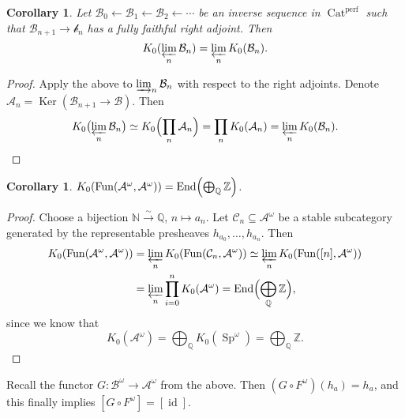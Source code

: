 \documentclass[draft]{amsart}
\newcommand{\NN}{\mathbb{N}}
\newcommand{\ZZ}{\mathbb{Z}}
\newcommand{\QQ}{\mathbb{Q}}
\newcommand{\cat}[1]{\mathcal{#1}}
\newcommand{\from}{\leftarrow}
\newcommand{\isoto}{\mathbin{\xrightarrow{\sim}}}
\DeclareMathOperator{\End}{End}
\DeclareMathOperator{\Cat}{Cat}
\DeclareMathOperator{\Sp}{Sp}
\DeclareMathOperator{\Fun}{Fun}
\DeclareMathOperator{\id}{id}
\DeclareMathOperator{\Ker}{Ker}
\newtheorem{cor}[thm]{Corollary}
\theoremstyle{definition}
\begin{document}
\begin{cor}
Let $\cat B_0\from \cat B_1 \from \cat B_2 \from \dotsb$ be an inverse sequence in $\Cat^{\mathrm{perf}}$ such that $\cat B_{n+1} \to \cat b_n$ has a fully faithful right adjoint. Then 
\[
K_0(\varprojlim_n \cat B_n) = \varprojlim_n K_0(\cat B_n).
\]
\end{cor}
\begin{proof}
Apply the above to $\varinjlim_n\cat B_n$ with respect to the right adjoints. Denote $\cat A_n = \Ker(\cat B_{n+1} \to \cat B)$. Then
\[
K_0\bigl(\varprojlim_n \cat B_n\bigr) \simeq K_0\Bigl(\prod_n\cat A_n\Bigr) = \prod_n K_0(\cat A_n) = \varprojlim_n K_0(\cat B_n).
\]
\end{proof}

\begin{cor}
$K_0(\Fun(\cat A^\omega, \cat A^\omega)) = \End\Bigl(\bigoplus_{\QQ}\ZZ\Bigr)$.
\end{cor}
\begin{proof}
Choose a bijection $\NN \isoto \QQ$, $n\mapsto a_n$. Let $\cat C_n \subseteq \cat A^\omega$ be a stable subcategory generated by the representable presheaves $h_{a_0},\dotsc,h_{a_n}$. Then
\begin{align*}
K_0(\Fun(\cat A^\omega, \cat A^\omega)) &= \varprojlim_n K_0(\Fun(\cat C_n, \cat A^\omega)) \simeq \varprojlim_n K_0(\Fun([n], \cat A^\omega)) \\
&= \varprojlim_n \prod_{i=0}^n K_0(\cat A^\omega) = \End\Bigl(\bigoplus_{\QQ}\ZZ \Bigr),
\end{align*}
since we know that
\[
K_0(\cat A^\omega) = \bigoplus_{\QQ} K_0(\Sp^\omega) = \bigoplus_{\QQ}\ZZ.
\]
\end{proof}

Recall the functor $G\colon \cat B^\omega \to \cat A^\omega$ from the above. Then $(G\circ F^\omega)(h_a) = h_a$, and this finally implies $[G\circ F^\omega] = [\id]$.
\end{document}
